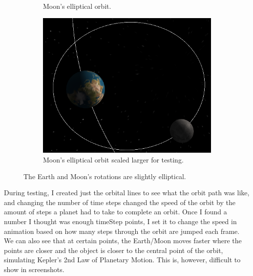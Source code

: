 \documentclass[12pt]{article}
\begin{document}
\begin{figure}[H]
\begin{subfigure}[b]{0.4\textwidth}
                \caption{Moon's elliptical orbit.}
                \label{fig: Moon's elliptical orbit.}
	 \end{subfigure}
        \begin{subfigure}[b]{0.54\textwidth}
                \includegraphics[width=\textwidth]{images/moonellipticalbig}
                \caption{Moon's elliptical orbit scaled larger for testing.}
                \label{fig: Moon's elliptical orbit scaled larger for testing.}
	 \end{subfigure}	 
	 \caption{The Earth and Moon's rotations are slightly elliptical.}
\end{figure}

During testing, I created just the orbital lines to see what the orbit path was like, and changing the number of time steps changed the speed of the orbit by the amount of steps a planet had to take to complete an orbit. Once I found a number I thought was enough timeStep points, I set it to change the speed in animation based on how many steps through the orbit are jumped each frame. We can also see that at certain points, the Earth/Moon moves faster where the points are closer and the object is closer to the central point of the orbit, simulating Kepler's 2nd Law of Planetary Motion. This is, however, difficult to show in screenshots.
\end{document}
